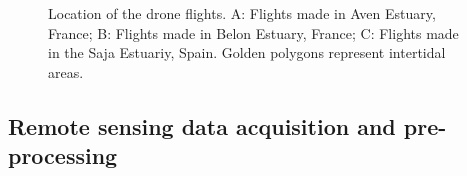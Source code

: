 \documentclass[
  letterpaper,
  DIV=11,
  numbers=noendperiod]{scrartcl}
\begin{document}
\label{cell-fig-location_sites}
\begin{figure}[H]


\caption{\label{fig-location_sites}Location of the drone flights. A:
Flights made in Aven Estuary, France; B: Flights made in Belon Estuary,
France; C: Flights made in the Saja Estuariy, Spain. Golden polygons
represent intertidal areas.}

\end{figure}%

\subsection{Remote sensing data acquisition and
pre-processing}\label{sec-DroneFlights}
\end{document}
